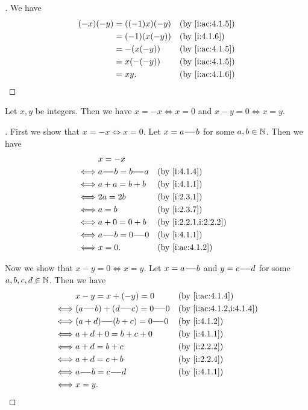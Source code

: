 \begin{proof}[]
  We have
  \begin{align*}
    (-x) (-y) & = ((-1) x) (-y) &  & \by{i:ac:4.1.5} \\
              & = (-1) (x (-y)) &  & \by{i:4.1.6}    \\
              & = -(x (-y))     &  & \by{i:ac:4.1.5} \\
              & = x (-(-y))     &  & \by{i:ac:4.1.5} \\
              & = xy.           &  & \by{i:ac:4.1.6}
  \end{align*}
\end{proof}

\begin{ac}\label{i:ac:4.1.8}
  Let \(x, y\) be integers.
  Then we have \(x = -x \iff x = 0\) and \(x - y = 0 \iff x = y\).
\end{ac}

\begin{proof}[]
  First we show that \(x = -x \iff x = 0\).
  Let \(x = a {-}\!{-} b\) for some \(a, b \in \mathbb{N}\).
  Then we have
  \begin{align*}
         & x = -x                                      \\
    \iff & a \mm b = b \mm a &  & \by{i:4.1.4}         \\
    \iff & a + a = b + b     &  & \by{i:4.1.1}         \\
    \iff & 2a = 2b           &  & \by{i:2.3.1}         \\
    \iff & a = b             &  & \by{i:2.3.7}         \\
    \iff & a + 0 = 0 + b     &  & \by{i:2.2.1,i:2.2.2} \\
    \iff & a \mm b = 0 \mm 0 &  & \by{i:4.1.1}         \\
    \iff & x = 0.            &  & \by{i:ac:4.1.2}
  \end{align*}

  Now we show that \(x - y = 0 \iff x = y\).
  Let \(x = a {-}\!{-} b\) and \(y = c {-}\!{-} d\) for some \(a, b, c, d \in \mathbb{N}\).
  Then we have
  \begin{align*}
         & x - y = x + (-y) = 0            &  & \by{i:ac:4.1.4}         \\
    \iff & (a \mm b) + (d \mm c) = 0 \mm 0 &  & \by{i:ac:4.1.2,i:4.1.4} \\
    \iff & (a + d) \mm (b + c) = 0 \mm 0   &  & \by{i:4.1.2}            \\
    \iff & a + d + 0 = b + c + 0           &  & \by{i:4.1.1}            \\
    \iff & a + d = b + c                   &  & \by{i:2.2.2}            \\
    \iff & a + d = c + b                   &  & \by{i:2.2.4}            \\
    \iff & a \mm b = c \mm d               &  & \by{i:4.1.1}            \\
    \iff & x = y.
  \end{align*}
\end{proof}


